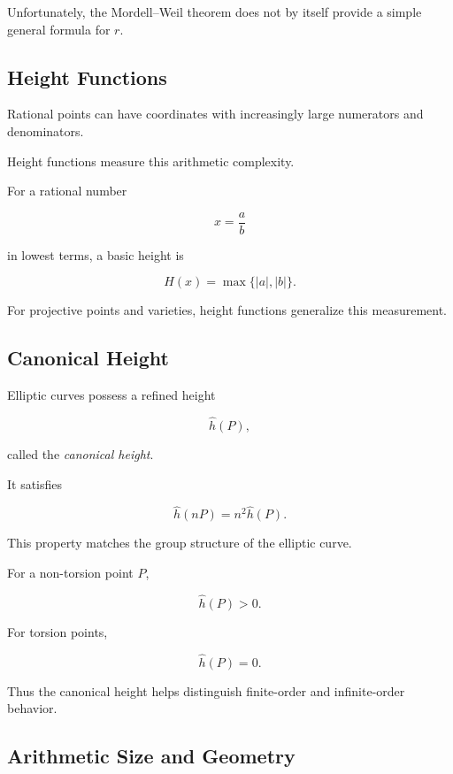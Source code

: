 Unfortunately, the Mordell--Weil theorem does not by itself provide a simple
general formula for \(r\).

\subsection{Height Functions}
\label{subsec:height-arithmetic-geometry}

Rational points can have coordinates with increasingly large numerators and
denominators.

Height functions measure this arithmetic complexity.

For a rational number

\[ x=\frac ab \]

in lowest terms, a basic height is

\[ H(x)=\max\{|a|,|b|\}. \]

For projective points and varieties, height functions generalize this
measurement.

\subsection{Canonical Height}
\label{subsec:canonical-height-arithmetic-geometry}

Elliptic curves possess a refined height

\[ \hat h(P), \]

called the \emph{canonical height}.

It satisfies

\[ \boxed{\hat h(nP)=n^2\hat h(P).} \]

This property matches the group structure of the elliptic curve.

For a non-torsion point \(P\),

\[ \hat h(P)>0. \]

For torsion points,

\[ \hat h(P)=0. \]

Thus the canonical height helps distinguish finite-order and infinite-order
behavior.

\subsection{Arithmetic Size and Geometry}
\label{subsec:arithmetic-size-geometry}

